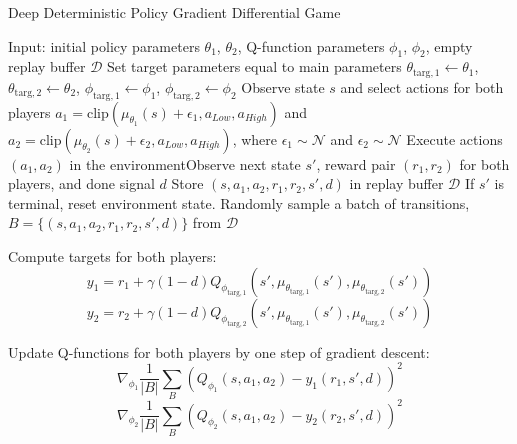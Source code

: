 \documentclass[conference]{IEEEtran}
\providecommand{\DIFadd}[1]{{\protect\color{blue}\uwave{#1}}} %
\providecommand{\DIFaddbegin}{} %
\providecommand{\DIFaddend}{} %
\providecommand{\DIFdelbegin}{} %
\providecommand{\DIFdelend}{} %
\newcommand{\DIFscaledelfig}{0.5}
\newlength{\DIFdelgraphicswidth} %
\newlength{\DIFdelgraphicsheight} %
\newcommand{\DIFaddincludegraphics}[2][]{{\color{blue}\fbox{\DIFOincludegraphics[#1]{#2}}}} %
\newcommand{\DIFdelincludegraphics}[2][]{%
\sbox{\DIFdelgraphicsbox}{\DIFOincludegraphics[#1]{#2}}%
\settoboxwidth{\DIFdelgraphicswidth}{\DIFdelgraphicsbox} %
\settoboxtotalheight{\DIFdelgraphicsheight}{\DIFdelgraphicsbox} %
\scalebox{\DIFscaledelfig}{%
\parbox[b]{\DIFdelgraphicswidth}{\usebox{\DIFdelgraphicsbox}\\[-\baselineskip] \rule{\DIFdelgraphicswidth}{0em}}\llap{\resizebox{\DIFdelgraphicswidth}{\DIFdelgraphicsheight}{%
\setlength{\unitlength}{\DIFdelgraphicswidth}%
\begin{picture}(1,1)%
\thicklines\linethickness{2pt} %
{\color[rgb]{1,0,0}\put(0,0){\framebox(1,1){}}}%
{\color[rgb]{1,0,0}\put(0,0){\line( 1,1){1}}}%
{\color[rgb]{1,0,0}\put(0,1){\line(1,-1){1}}}%
\end{picture}%
}\hspace*{3pt}}} %
} %
\DeclareRobustCommand{\DIFaddbegin}{\DIFOaddbegin \let\includegraphics\DIFaddincludegraphics} %
\DeclareRobustCommand{\DIFaddend}{\DIFOaddend \let\includegraphics\DIFOincludegraphics} %
\DeclareRobustCommand{\DIFdelbegin}{\DIFOdelbegin \let\includegraphics\DIFdelincludegraphics} %
\DeclareRobustCommand{\DIFdelend}{\DIFOaddend \let\includegraphics\DIFOincludegraphics} %
\begin{document}
\begin{algorithm}[H]
    \caption{Deep Deterministic Policy Gradient Differential Game}
    \label{alg1}
\begin{algorithmic}[1]
    \STATE Input: initial policy parameters $\theta_1$, $\theta_2$, Q-function parameters $\phi_1$, $\phi_2$, empty replay buffer $\mathcal{D}$
    \STATE Set target parameters equal to main parameters $\theta_{\text{targ},1} \leftarrow \theta_1$, $\theta_{\text{targ},2} \leftarrow \theta_2$, $\phi_{\text{targ},1} \leftarrow \phi_1$, $\phi_{\text{targ},2} \leftarrow \phi_2$
    \REPEAT
        \STATE Observe state $s$ and select actions for both players $a_1 = \text{clip}(\mu_{\theta_1}(s) + \epsilon_1, a_{Low}, a_{High})$ and $a_2 = \text{clip}(\mu_{\theta_2}(s) + \epsilon_2, a_{Low}, a_{High})$, where $\epsilon_1 \sim \mathcal{N}$ and $\epsilon_2 \sim \mathcal{N}$
        \STATE Execute actions $(a_1, a_2)$ in the environment\DIFaddbegin \DIFadd{.
        }\DIFaddend \STATE Observe next state $s'$, reward pair $(r_1, r_2)$ for both players, and done signal $d$
        \STATE Store $(s, a_1, a_2, r_1, r_2, s', d)$ in replay buffer $\mathcal{D}$
        \STATE If $s'$ is terminal, reset environment state.
            \DIFdelbegin %
\DIFdelend \DIFaddbegin {}
                \DIFaddend \STATE Randomly sample a batch of transitions, $B = \{ (s, a_1, a_2, r_1, r_2, s', d) \}$ from $\mathcal{D}$

                \STATE Compute targets for both players:
                \begin{equation*}
                    y_1 = r_1 + \gamma (1 - d) Q_{\phi_{\text{targ},1}}(s', \mu_{\theta_{\text{targ},1}}(s'), \mu_{\theta_{\text{targ},2}}(s'))
                \end{equation*}
                \begin{equation*}
                    y_2 = r_2 + \gamma (1 - d) Q_{\phi_{\text{targ},2}}(s', \mu_{\theta_{\text{targ},1}}(s'), \mu_{\theta_{\text{targ},2}}(s'))
                \end{equation*}

                \STATE Update Q-functions for both players by one step of gradient descent:
                \begin{equation*}
                    \nabla_{\phi_1} \frac{1}{|B|} \sum_{B} \left( Q_{\phi_1}(s, a_1, a_2) - y_1(r_1, s', d) \right)^2
                \end{equation*}
                \begin{equation*}
                    \nabla_{\phi_2} \frac{1}{|B|} \sum_{B} \left( Q_{\phi_2}(s, a_1, a_2) - y_2(r_2, s', d) \right)^2
                \end{equation*}


\end{algorithmic}
\end{algorithm}
\end{document}
